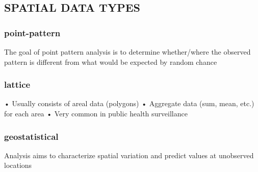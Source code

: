\documentclass[
]{article}
\begin{document}
\hypertarget{spatial-data-types}{%
\subsection{SPATIAL DATA TYPES}\label{spatial-data-types}}

\hypertarget{point-pattern}{%
\subsubsection{point-pattern}\label{point-pattern}}

The goal of point pattern analysis is to determine whether/where the
observed pattern is different from what would be expected by random
chance

\hypertarget{lattice}{%
\subsubsection{lattice}\label{lattice}}

• Usually consists of areal data (polygons) • Aggregate data (sum, mean,
etc.) for each area • Very common in public health surveillance

\hypertarget{geostatistical}{%
\subsubsection{geostatistical}\label{geostatistical}}

Analysis aims to characterize spatial variation and predict values at
unobserved locations
\end{document}
